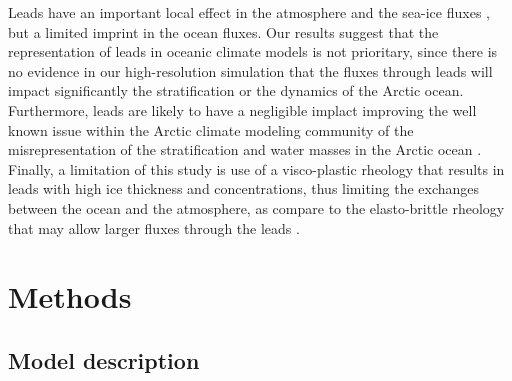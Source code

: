 \documentclass[draft]{agujournal2019}
\begin{document}
Leads have an important local effect in the atmosphere and the sea-ice fluxes \citep{Lupkes_leads_2008,Marcq_flux_lead_2012}, but a limited imprint in the ocean fluxes. Our results suggest that the representation of leads in oceanic climate models is not prioritary, since there is no evidence in our high-resolution simulation that the fluxes through leads will impact significantly the stratification or the dynamics of the Arctic ocean.
Furthermore, leads are likely to have a negligible implact improving the well known issue within the Arctic climate modeling community of the misrepresentation of the stratification and water masses in the Arctic ocean \citep{Wang_ompi_2024,Ilicak_core_2016}. Finally, a limitation of this study is use of a visco-plastic rheology that results in leads with high ice thickness and  concentrations, thus limiting the exchanges between the ocean and the atmosphere, as compare to the elasto-brittle rheology that may allow larger fluxes through the leads \citep{Rampal_nextsim_2016,Olason_lead_2021}. 









\section{Methods}
\subsection*{Model description}
\end{document}
